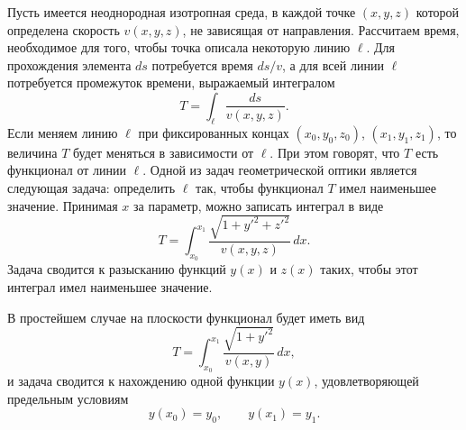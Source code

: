 \begin{rusblock}
Пусть имеется неоднородная изотропная среда, в каждой точке $(x,y,z)$ которой определена скорость $v(x,y,z)$, не зависящая от направления. Рассчитаем время, необходимое для того, чтобы точка описала некоторую линию $\ell$. Для прохождения элемента $ds$ потребуется время $ds/v$, а для всей линии $\ell$ потребуется промежуток времени, выражаемый интегралом
\[
T=\int_{\ell}\frac{ds}{v(x,y,z)}.
\]
Если меняем линию $\ell$ при фиксированных концах $(x_0,y_0,z_0)$, $(x_1,y_1,z_1)$, то величина $T$ будет меняться в зависимости от $\ell$. При этом говорят, что $T$ есть функционал от линии $\ell$. Одной из задач геометрической оптики является следующая задача: определить $\ell$ так, чтобы функционал $T$ имел наименьшее значение. Принимая $x$ за параметр, можно записать интеграл в виде
\[
T=\int_{x_0}^{x_1}\frac{\sqrt{1+y'^2+z'^2}}{v(x,y,z)}\,dx.
\]
Задача сводится к разысканию функций $y(x)$ и $z(x)$ таких, чтобы этот интеграл имел наименьшее значение.

В простейшем случае на плоскости функционал будет иметь вид
\[
T=\int_{x_0}^{x_1}\frac{\sqrt{1+y'^2}}{v(x,y)}\,dx,
\]
и задача сводится к нахождению одной функции $y(x)$, удовлетворяющей предельным условиям
\[
y(x_0)=y_0,\qquad y(x_1)=y_1.
\]
\end{rusblock}

